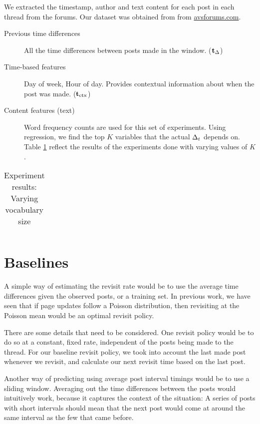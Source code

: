 We extracted the timestamp, author and text content for each post in each thread
from the forums. Our dataset was obtained from from \url{avsforums.com}.
\begin{description}
	\item[Previous time differences] All the time differences between posts made 
		in the window. ($\mathbf{t}_\Delta$)
	\item[Time-based features] Day of week, Hour of day. Provides contextual 
		information about when the post was made. ($\mathbf{t}_\text{ctx}$)
	\item[Content features (text)] Word frequency counts are used for this set 
		of experiments. Using regression, we find the top $K$ variables that the 
		actual $\Delta_t$ depends on.  Table \ref{vocab_exp} reflect the results of 
		the experiments done with varying values of $K$.
\end{description}

\begin{table}
	\footnotesize
	\begin{centering}
	\begin{tabular}{|l|c|c|c|c|c|c|c|c|}
	\hline
	
	\hline
	\end{tabular}
	\caption{Experiment results: Varying vocabulary size}
	\label{vocab_exp}
\end{centering}
\end{table}



\section{Baselines}
A simple way of estimating the revisit rate would be to use the average time 
differences given the observed posts, or a training set. In previous work, we 
have seen that if page updates follow a Poisson distribution, then revisiting at 
the Poisson mean would be an optimal revisit policy. %

There are some details that need to be considered. One revisit policy would be 
to do so at a constant, fixed rate, independent of the posts being made to the 
thread. For our baseline revisit policy, we took into account the last made post 
whenever we revisit, and calculate our next revisit time based on the last post.

Another way of predicting using average post interval timings would be to use a 
sliding window. Averaging out the time differences between the posts would 
intuitively work, because it captures the context of the situation: A series of 
posts with short intervals should mean that the next post would come at around 
the same interval as the few that came before.

